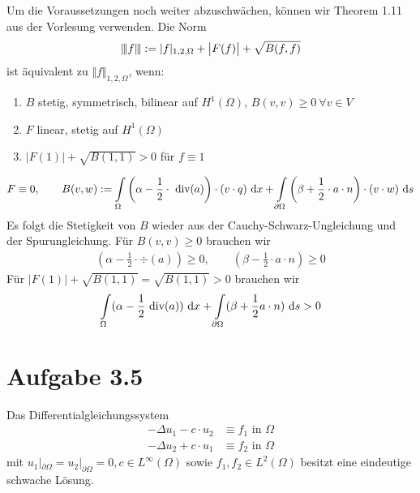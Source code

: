 \documentclass[12pt,a4paper]{article}
\begin{document}
\begin{lösung}
Um die Voraussetzungen noch weiter abzuschwächen, können wir Theorem 1.11 aus der Vorlesung verwenden. Die Norm
\begin{align*}
{\left\vert\kern-0.25ex\left\vert\kern-0.25ex\left\vert f \right\vert\kern-0.25ex\right\vert\kern-0.25ex\right\vert}:=|f|_{1,2,\Omega}+\big|F(f)\big|+\sqrt{B(f,f)}
\end{align*}
ist äquivalent zu $\Vert f\Vert_{1,2,\Omega}$, wenn:
\begin{enumerate}
\item $B$ stetig, symmetrisch, bilinear auf $H^1(\Omega)$, $B(v,v)\geq0~\forall v\in V$
\item $F$ linear, stetig auf $H^1(\Omega)$
\item $\big|F(1)\big|+\sqrt{B(1,1)}>0$ für $f\equiv1$
\end{enumerate}
\begin{align*}
F\equiv 0,\qquad B(v,w):=\int\limits_\Omega\left(\alpha-\frac{1}{2}\cdot\text{ div}(a)\right)\cdot(v\cdot q)\text{ d} x+\int\limits_{\partial\Omega}\left(\beta+\frac{1}{2}\cdot a\cdot n\right)\cdot(v\cdot w)\text{ d} s
\end{align*}
Es folgt die Stetigkeit von $B$ wieder aus der Cauchy-Schwarz-Ungleichung und der Spurungleichung. Für $B(v,v)\geq0$ brauchen wir 
\begin{align*}
\left(\alpha-\frac{1}{2}\cdot\div(a)\right)\geq 0,\qquad
\left(\beta-\frac{1}{2}\cdot a\cdot n\right)\geq 0
\end{align*}
Für $\big|F(1)\big|+\sqrt{B(1,1)}=\sqrt{B(1,1)}>0$ brauchen wir
\begin{align*}
	\int\limits_\Omega(\alpha-\frac{1}{2}\text{ div}(a)) \text{ d} x + \int\limits_{\partial\Omega} (\beta + \frac{1}{2}a\cdot n) \text{ d} s > 0
\end{align*}
\end{lösung}

\section*{Aufgabe 3.5}
Das Differentialgleichungssystem
\begin{align*}
-\Delta u_1-c\cdot u_2&\equiv f_1\text{ in }\Omega\\
-\Delta u_2+c\cdot u_1&\equiv f_2\text{ in }\Omega
\end{align*}
mit $u_1|_{\partial\Omega}=u_2|_{\partial\Omega}=0,c\in L^\infty(\Omega)$ sowie $f_1,f_2\in L^2(\Omega)$ besitzt eine eindeutige schwache Lösung.
\end{document}
